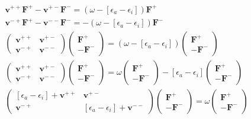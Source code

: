 \begin{align}
    \mathbf{v}^{++}\mathbf{F}^{+} - \mathbf{v}^{+-}\mathbf{F}^{-} = \left(\omega - \left[\epsilon_{a}-\epsilon_{i}\right]\right) \mathbf{F}^{+} \\
    \mathbf{v}^{-+}\mathbf{F}^{+} - \mathbf{v}^{--}\mathbf{F}^{-} = -\left(\omega - \left[\epsilon_{a}-\epsilon_{i}\right]\right) \mathbf{F}^{-} \\
    \begin{pmatrix}
        \mathbf{v}^{++} & \mathbf{v}^{+-} \\
        \mathbf{v}^{-+} & \mathbf{v}^{--}
    \end{pmatrix}
    \begin{pmatrix}
        \mathbf{F}^{+} \\
        -\mathbf{F}^{-}
    \end{pmatrix} = \left(\omega - \left[\epsilon_{a}-\epsilon_{i}\right]\right) \begin{pmatrix}
        \mathbf{F}^{+} \\
        -\mathbf{F}^{-}
    \end{pmatrix}\\
\begin{pmatrix}
        \mathbf{v}^{++} & \mathbf{v}^{+-} \\
        \mathbf{v}^{-+} & \mathbf{v}^{--}
    \end{pmatrix}
    \begin{pmatrix}
        \mathbf{F}^{+} \\
        -\mathbf{F}^{-}
    \end{pmatrix} = \omega \begin{pmatrix}
        \mathbf{F}^{+} \\
        -\mathbf{F}^{-}
    \end{pmatrix}
- \left[\epsilon_{a}-\epsilon_{i}\right] \begin{pmatrix}
        \mathbf{F}^{+} \\
        -\mathbf{F}^{-}
    \end{pmatrix}\\
\begin{pmatrix}
    \left[\epsilon_{a}-\epsilon_{i}\right] + \mathbf{v}^{++} & \mathbf{v}^{+-} \\
    \mathbf{v}^{-+} & \left[\epsilon_{a}-\epsilon_{i}\right] + \mathbf{v}^{--}
\end{pmatrix}
\begin{pmatrix}
    \mathbf{F}^{+} \\
    -\mathbf{F}^{-}
\end{pmatrix}
= \omega \begin{pmatrix}
    \mathbf{F}^{+} \\
    -\mathbf{F}^{-}
\end{pmatrix}
\end{align}
